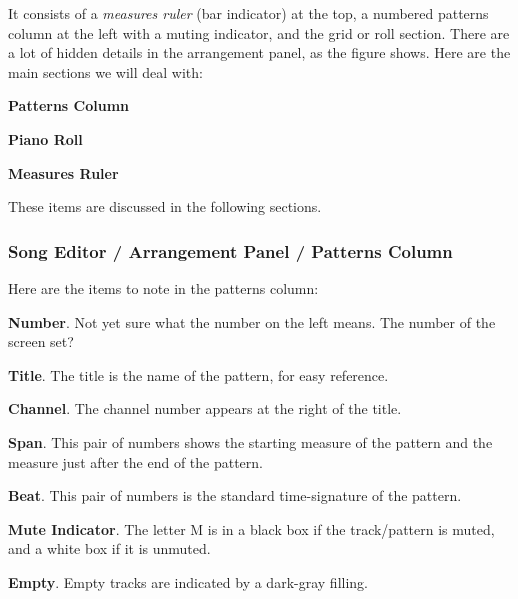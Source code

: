    It consists of a \textsl{measures ruler} (bar indicator) at the top, a
   numbered patterns column at the left with a muting indicator, and the
   grid or roll section.  There are a lot of hidden details in the
   arrangement panel, as the figure shows.  Here are the main sections we
   will deal with:

   \begin{enumber}
      \item \textbf{Patterns Column}
      \item \textbf{Piano Roll}
      \item \textbf{Measures Ruler}
   \end{enumber}

   These items are discussed in the following sections.

\subsubsection{Song Editor / Arrangement Panel / Patterns Column}
\label{subsubsec:seq24_song_editor_arrangement_panel_patterns_column}

   Here are the items to note in the patterns column:

   \begin{enumber}
      \item \textbf{Number}.
         Not yet sure what the number on the left means.
         The number of the screen set?
      \item \textbf{Title}.
         The title is the name of the pattern, for easy reference.
      \item \textbf{Channel}.
         The channel number appears at the right of the title.
      \item \textbf{Span}.
         This pair of numbers shows the starting measure of the pattern and
         the measure just after the end of the pattern.
      \item \textbf{Beat}.
         This pair of numbers is the standard time-signature of the pattern.
      \item \textbf{Mute Indicator}.
         The letter M is in a black box if the track/pattern is muted, and a
         white box if it is unmuted.
      \item \textbf{Empty}.
         Empty tracks are indicated by a dark-gray filling.
   \end{enumber}

